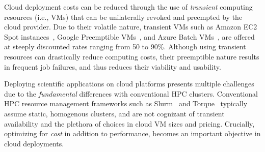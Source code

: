 Cloud deployment costs can be reduced through the use of \emph{transient} computing resources (i.e., VMs) that can be unilaterally revoked and preempted by the cloud provider.
Due to their volatile nature, transient VMs such as Amazon EC2 Spot instances~\cite{spot-documentation}, Google Preemptible VMs~\cite{preemptible-documentation}, and Azure Batch VMs~\cite{azure-batch}, are offered at steeply discounted rates ranging from 50 to 90\%. 
Although using transient resources can drastically reduce computing costs, their preemptible nature results in frequent job failures, and thus reduces their viability and usability. 


Deploying scientific applications on cloud platforms presents multiple challenges due to the \emph{fundamental} differences with conventional HPC clusters.
Conventional HPC resource management frameworks such as Slurm~\cite{} and Torque~\cite{} typically assume static, homogenous clusters, and are not cognizant of transient availability and the plethora of choices in cloud VM sizes and pricing. %
Crucially, optimizing for \emph{cost} in addition to performance, becomes an important 
 objective in cloud deployments. 

%







